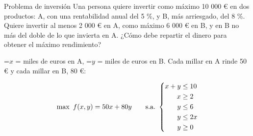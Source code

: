\documentclass[11pt,a4paper]{article}
\newcommand{\fmm}[1]{\setbox0=\hbox{$#1$}\ifdim\wd0>\linewidth\fmdisp{#1}\else\mbox{\box0}\fi}
\newcommand{\fmdisp}[1]{\[\setbox2=\hbox{$\displaystyle #1$}\ifdim\wd2>\linewidth\resizebox{\linewidth}{!}{\box2}\else\box2\fi\]}
\begin{document}
\begin{fmex}{Problema de inversión}
Una persona quiere invertir como máximo 10 000 € en dos productos: A, con una rentabilidad anual del 5 \%, y B, más arriesgado, del 8 \%. Quiere invertir al menos 2 000 € en A, como máximo 6 000 € en B, y en B no más del doble de lo que invierta en A. ¿Cómo debe repartir el dinero para obtener el máximo rendimiento?

\fmm{x} = miles de euros en A, \fmm{y} = miles de euros en B. Cada millar en A rinde 50 € y cada millar en B, 80 €:

\fmdisp{\max\ f(x,y)=50x+80y\qquad\text{s.a.}\ \left\{\begin{aligned}x+y&\leq10\\ x&\geq2\\ y&\leq6\\ y&\leq2x\\ y&\geq0\end{aligned}\right.}


\end{fmex}
\end{document}
